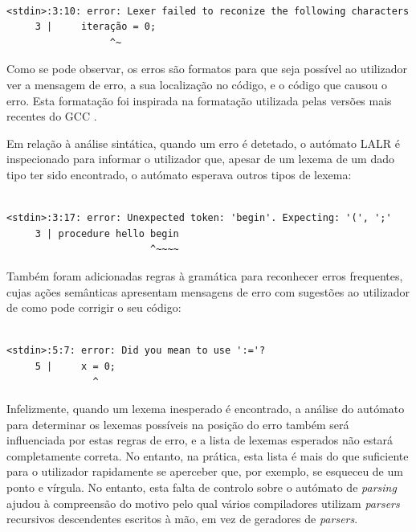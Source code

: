 \documentclass[12pt, a4paper]{article}
\begin{document}

\begin{lstlisting}

<stdin>:3:10: error: Lexer failed to reconize the following characters
     3 |     iteração = 0;
                  ^~
\end{lstlisting}

Como se pode observar, os erros são formatos para que seja possível ao utilizador ver a mensagem de
erro, a sua localização no código, e o código que causou o erro. Esta formatação foi inspirada na
formatação utilizada pelas versões mais recentes do GCC \cite{gcc-errors}.

Em relação à análise sintática, quando um erro é detetado, o autómato LALR é inspecionado para
informar o utilizador que, apesar de um lexema de um dado tipo ter sido encontrado, o autómato
esperava outros tipos de lexema:

\begin{lstlisting}

<stdin>:3:17: error: Unexpected token: 'begin'. Expecting: '(', ';'
     3 | procedure hello begin
                         ^~~~~
\end{lstlisting}

Também foram adicionadas regras à gramática para reconhecer erros frequentes, cujas ações semânticas
apresentam mensagens de erro com sugestões ao utilizador de como pode corrigir o seu código:

\begin{lstlisting}

<stdin>:5:7: error: Did you mean to use ':='?
     5 |     x = 0;
               ^
\end{lstlisting}

Infelizmente, quando um lexema inesperado é encontrado, a análise do autómato para determinar os
lexemas possíveis na posição do erro também será influenciada por estas regras de erro, e a lista
de lexemas esperados não estará completamente correta. No entanto, na prática, esta lista é mais
do que suficiente para o utilizador rapidamente se aperceber que, por exemplo, se esqueceu de um
ponto e vírgula. No entanto, esta falta de controlo sobre o autómato de \emph{parsing} ajudou à
compreensão do motivo pelo qual vários compiladores utilizam \emph{parsers} recursivos descendentes
escritos à mão, em vez de geradores de \emph{parsers}. \cite{compilers-handwritten-parser}
\end{document}
